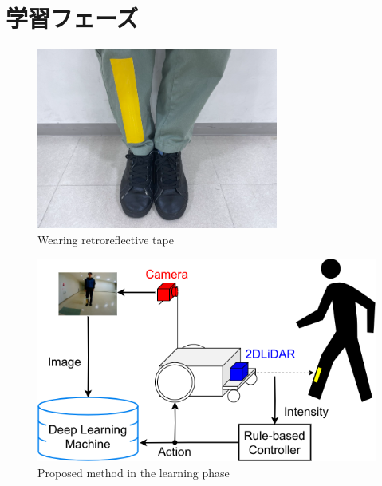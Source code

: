 
\section{学習フェーズ}

\begin{figure}[h]
  \centering
  \includegraphics[keepaspectratio, scale=0.7] {images/RobotGuidance_learning_phase_leg.png}
  \captionsetup{justification=raggedright} %
  \caption{Wearing retroreflective tape}
  \label{Fig:RobotGuidance_learning_phase_leg}
\end{figure}

\begin{figure}[h]
  \centering
  \includegraphics[keepaspectratio, scale=0.60] {images/RobotGuidance_learning_system.png}
  \captionsetup{justification=raggedright} %
  \caption{Proposed method in the learning phase}
  \label{Fig:RobotGuidance_learning_system}
\end{figure}

\newpage

